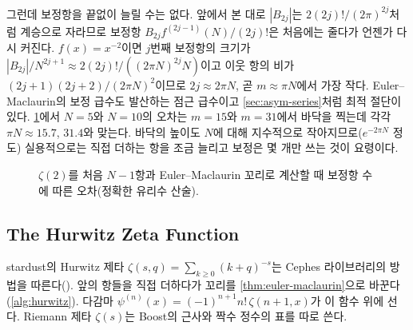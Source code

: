 그런데 보정항을 끝없이 늘릴 수는 없다. 앞에서 본 대로 $|B_{2j}|$는 $2(2j)!/(2\pi)^{2j}$처럼 계승으로 자라므로 보정항 $B_{2j}f^{(2j-1)}(N)/(2j)!$은 처음에는 줄다가 언젠가 다시 커진다. $f(x)=x^{-2}$이면 $j$번째 보정항의 크기가 $|B_{2j}|/N^{2j+1}\approx2(2j)!/((2\pi N)^{2j}N)$이고 이웃 항의 비가 $(2j+1)(2j+2)/(2\pi N)^2$이므로 $2j\approx2\pi N$, 곧 $m\approx\pi N$에서 가장 작다. Euler--Maclaurin의 보정 급수도 발산하는 점근 급수이고 \cref{sec:asym-series}처럼 최적 절단이 있다. \cref{fig:em-zeta2}에서 $N=5$와 $N=10$의 오차는 $m=15$와 $m=31$에서 바닥을 찍는데 각각 $\pi N\approx15.7$, $31.4$와 맞는다. 바닥의 높이도 $N$에 대해 지수적으로 작아지므로($e^{-2\pi N}$ 정도) 실용적으로는 직접 더하는 항을 조금 늘리고 보정은 몇 개만 쓰는 것이 요령이다.

\begin{figure}[htbp]
\centering
{}
\caption{$\zeta(2)$를 처음 $N-1$항과 Euler--Maclaurin 꼬리로 계산할 때 보정항 수에 따른 오차(정확한 유리수 산술).}
\label{fig:em-zeta2}
\end{figure}

\subsection{The Hurwitz Zeta Function}

stardust의 Hurwitz 제타 $\zeta(s,q)=\sum_{k\ge0}(k+q)^{-s}$는 Cephes 라이브러리의 방법을 따른다(). 앞의 항들을 직접 더하다가 꼬리를 \cref{thm:euler-maclaurin}으로 바꾼다(\cref{alg:hurwitz}). 다감마 $\psi^{(n)}(x)=(-1)^{n+1}n!\,\zeta(n+1,x)$가 이 함수 위에 선다. Riemann 제타 $\zeta(s)$는 Boost의 근사와 짝수 정수의 표를 따로 쓴다.

